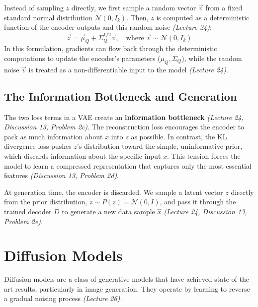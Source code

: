 \documentclass[11pt]{article}
\begin{document}
Instead of sampling $z$ directly, we first sample a random vector $\vec{v}$ from a fixed standard normal distribution $\mathcal{N}(0, I_k)$. Then, $z$ is computed as a deterministic function of the encoder outputs and this random noise \textit{(Lecture 24)}:
\[ \vec{z} = \vec{\mu}_Q + \Sigma_Q^{1/2} \vec{v}, \quad \text{where } \vec{v} \sim \mathcal{N}(0, I_k) \]
In this formulation, gradients can flow back through the deterministic computations to update the encoder's parameters ($\mu_Q, \Sigma_Q$), while the random noise $\vec{v}$ is treated as a non-differentiable input to the model \textit{(Lecture 24)}.

\subsection{The Information Bottleneck and Generation}
The two loss terms in a VAE create an \textbf{information bottleneck} \textit{(Lecture 24, Discussion 13, Problem 2c)}. The reconstruction loss encourages the encoder to pack as much information about $x$ into $z$ as possible. In contrast, the KL divergence loss pushes $z$'s distribution toward the simple, uninformative prior, which discards information about the specific input $x$. This tension forces the model to learn a compressed representation that captures only the most essential features \textit{(Discussion 13, Problem 2d)}.

At generation time, the encoder is discarded. We sample a latent vector $z$ directly from the prior distribution, $z \sim P(z) = \mathcal{N}(0, I)$, and pass it through the trained decoder $D$ to generate a new data sample $\hat{x}$ \textit{(Lecture 24, Discussion 13, Problem 2e)}.

\section{Diffusion Models}
Diffusion models are a class of generative models that have achieved state-of-the-art results, particularly in image generation. They operate by learning to reverse a gradual noising process \textit{(Lecture 26)}.
\end{document}
